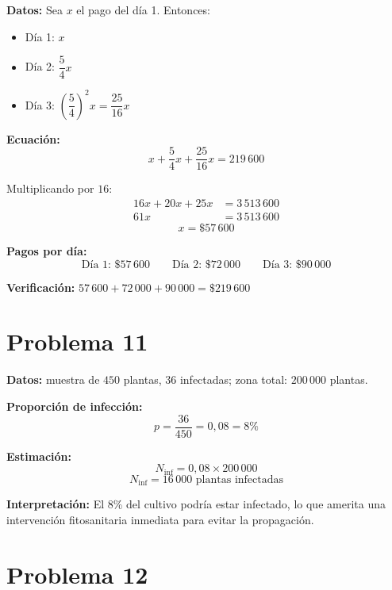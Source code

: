 \documentclass[12pt]{article}
\begin{document}
	\textbf{Datos:} Sea $x$ el pago del día 1. Entonces:
	
	\begin{itemize}
		\item Día 1: $x$
		\item Día 2: $\dfrac{5}{4}x$
		\item Día 3: $\left(\dfrac{5}{4}\right)^{2}x = \dfrac{25}{16}x$
	\end{itemize}
	
	\textbf{Ecuación:}
	\[
	x + \frac{5}{4}x + \frac{25}{16}x = 219\,600
	\]
	
	Multiplicando por $16$:
	\begin{align*}
		16x + 20x + 25x &= 3\,513\,600 \\
		61x             &= 3\,513\,600
	\end{align*}
	\[
	\boxed{x = \$57\,600}
	\]
	
	\textbf{Pagos por día:}
	\[
	\text{Día 1: } \$57\,600 \qquad
	\text{Día 2: } \$72\,000 \qquad
	\text{Día 3: } \$90\,000
	\]
	
	\textbf{Verificación:} $57\,600 + 72\,000 + 90\,000 = \$219\,600$ \checkmark
	
	\bigskip
	
	\section*{Problema 11}
	
	\textbf{Datos:} muestra de $450$ plantas, $36$ infectadas; zona total: $200\,000$ plantas.
	
	\textbf{Proporción de infección:}
	\[
	p = \frac{36}{450} = 0{,}08 = 8\%
	\]
	
	\textbf{Estimación:}
	\[
	N_{\text{inf}} = 0{,}08 \times 200\,000
	\]
	\[
	\boxed{N_{\text{inf}} = 16\,000 \text{ plantas infectadas}}
	\]
	
	\textbf{Interpretación:} El 8\% del cultivo podría estar infectado, lo que
	amerita una intervención fitosanitaria inmediata para evitar la propagación.
	
	\bigskip
	
	\section*{Problema 12}
	
\end{document}
